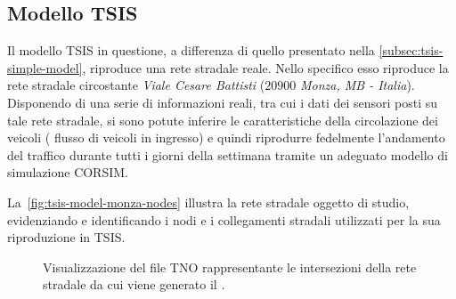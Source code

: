 \subsection{Modello TSIS}\label{subsec:tsis-monza-model}
Il modello \acs{TSIS} in questione, a differenza di quello presentato nella \autoref{subsec:tsis-simple-model}, riproduce una rete stradale reale. Nello specifico esso riproduce la rete stradale circostante \emph{Viale Cesare Battisti} ($20900$ \emph{Monza, MB - Italia}). Disponendo di una serie di informazioni reali, tra cui i dati dei sensori posti su tale rete stradale, si sono potute inferire le caratteristiche della circolazione dei veicoli (\eg{} flusso di veicoli in ingresso) e quindi riprodurre fedelmente l'andamento del traffico durante tutti i giorni della settimana tramite un adeguato modello di simulazione \acs{CORSIM}.

La~\vref{fig:tsis-model-monza-nodes} illustra la rete stradale oggetto di studio, evidenziando e identificando i nodi e i collegamenti stradali utilizzati per la sua riproduzione in \acs{TSIS}.
\begin{figure}
  \centering
  \captionsetup[subfigure]{labelformat=empty}
  \label{fig:tsis-model-monza-nodes}
\end{figure}
\begin{figure}
  \centering
  \captionsetup{type=figure}
  \captionsetup[subfigure]{labelformat=empty}
  \caption[Intersezioni della rete stradale del ]{Visualizzazione del file \acs{TNO} rappresentante le intersezioni della rete stradale da cui viene generato il .}
\end{figure}

